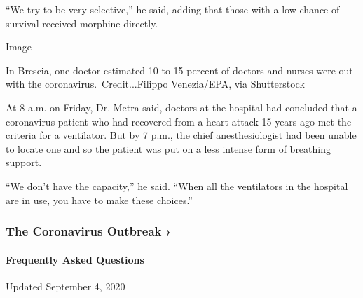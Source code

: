 ``We try to be very selective,'' he said, adding that those with a low
chance of survival received morphine directly.

Image

In Brescia, one doctor estimated 10 to 15 percent of doctors and nurses
were out with the coronavirus.~Credit...Filippo Venezia/EPA, via
Shutterstock

At 8 a.m. on Friday, Dr. Metra said, doctors at the hospital had
concluded that a coronavirus patient who had recovered from a heart
attack 15 years ago met the criteria for a ventilator. But by 7 p.m.,
the chief anesthesiologist had been unable to locate one and so the
patient was put on a less intense form of breathing support.

``We don't have the capacity,'' he said. ``When all the ventilators in
the hospital are in use, you have to make these choices.''

\href{https://www.nytimes3xbfgragh.onion/news-event/coronavirus?action=click\&pgtype=Article\&state=default\&region=MAIN_CONTENT_3\&context=storylines_faq}{}

\hypertarget{the-coronavirus-outbreak-}{%
\subsubsection{The Coronavirus Outbreak
›}\label{the-coronavirus-outbreak-}}

\hypertarget{frequently-asked-questions}{%
\paragraph{Frequently Asked
Questions}\label{frequently-asked-questions}}

Updated September 4, 2020

